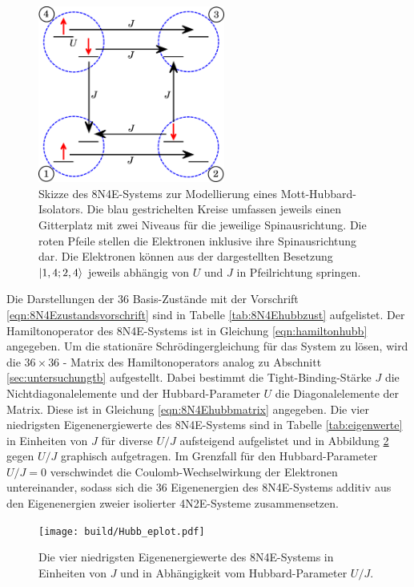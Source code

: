 \begin{figure}
  \centering
  \includegraphics[height = 5.8cm]{Graphiken/hubbard_system.pdf}
  \caption{Skizze des 8N4E-Systems zur Modellierung eines Mott-Hubbard-Isolators. Die blau gestrichelten Kreise umfassen jeweils einen Gitterplatz mit zwei Niveaus
  für die jeweilige Spinausrichtung. Die roten Pfeile stellen die Elektronen inklusive ihre Spinausrichtung dar. Die Elektronen können aus der dargestellten Besetzung $\ket{1,4;2,4}$
  jeweils abhängig von $U$ und $J$ in Pfeilrichtung springen.}
  \label{fig:hubbsystem}
\end{figure}

Die Darstellungen der $36$ Basis-Zustände mit der Vorschrift \eqref{eqn:8N4Ezustandsvorschrift} sind in Tabelle \ref{tab:8N4Ehubbzust} aufgelistet.
Der Hamiltonoperator des 8N4E-Systems ist in Gleichung \eqref{eqn:hamiltonhubb} angegeben.
Um die stationäre Schrödingergleichung für das System zu lösen, wird die $36 \times 36$ - Matrix des Hamiltonoperators analog zu Abschnitt \ref{sec:untersuchungtb} aufgestellt.
Dabei bestimmt die Tight-Binding-Stärke $J$ die Nichtdiagonalelemente und der Hubbard-Parameter $U$ die Diagonalelemente der Matrix.
Diese ist in Gleichung \eqref{eqn:8N4Ehubbmatrix} angegeben.
Die vier niedrigsten Eigenenergiewerte des 8N4E-Systems sind in Tabelle \ref{tab:eigenwerte} in Einheiten von $J$ für diverse $U/J$ aufsteigend aufgelistet und in Abbildung \ref{fig:eplot} gegen $U/J$ graphisch aufgetragen.
Im Grenzfall für den Hubbard-Parameter $U/J = 0$ verschwindet die Coulomb-Wechselwirkung der Elektronen untereinander, sodass sich die 36 Eigenenergien des 8N4E-Systems additiv aus den
Eigenenergien zweier isolierter 4N2E-Systeme zusammensetzen.

\begin{figure}[H]
  \centering
  \texttt{[image: build/Hubb\_eplot.pdf]}
  \caption{Die vier niedrigsten Eigenenergiewerte des 8N4E-Systems in Einheiten von $J$ und in Abhängigkeit vom Hubbard-Parameter $U/J$.}
  \label{fig:eplot}
\end{figure}

